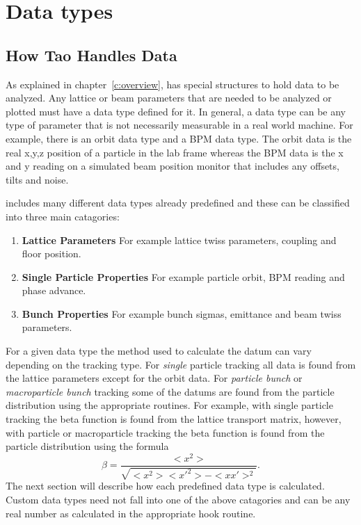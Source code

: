 \chapter{Data types}
\label{c:data_types}

\section{How Tao Handles Data}

As explained in chapter~\ref{c:overview}, \tao has special structures to hold
data to be analyzed. Any lattice or beam parameters that are needed to be
analyzed or plotted must have a data type defined for it. In general, a data
type can be any type of parameter that is not necessarily measurable in a real
world machine. For example, there is an orbit data type and a BPM data type. The
orbit data is the real x,y,z position of a particle in the lab frame whereas the BPM
data is the x and y reading on a simulated beam position monitor that includes
any offsets, tilts and noise.

\tao includes many different data types already predefined and
these can be classified into three main catagories:
\begin{enumerate}
  \item \textbf{Lattice Parameters} \Newline
    For example lattice twiss parameters, coupling and floor position.
  \item \textbf{Single Particle Properties} \Newline
    For example particle orbit, BPM reading and phase advance.
  \item \textbf{Bunch Properties} \Newline
    For example bunch sigmas, emittance and beam twiss parameters.
\end{enumerate}
For a given data type the method used to calculate the datum can vary depending
on the tracking type. For {\it single} particle tracking all data is found from
the lattice parameters except for the orbit data. For \textit{particle bunch} or
\textit{macroparticle bunch} tracking some of the datums  are found from the
particle distribution using the appropriate \bmad routines. For example, with
single particle tracking the beta function is found from the lattice transport
matrix, however, with particle or macroparticle tracking the beta function is
found from the particle distribution using the formula
\begin{equation}
  \beta = \frac{<x^{2}>}{\sqrt{<x^{2}> <x'^{2}> - <x x'>^{2}}}.
\end{equation}
The next section will describe how each predefined data type is calculated.
Custom data types need not fall into one of the above catagories and can be any
real number as calculated in the appropriate hook routine.

